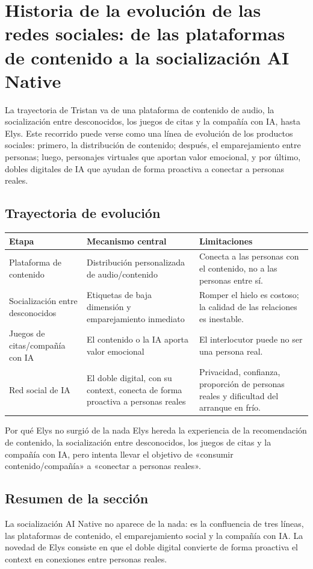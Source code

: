 \section{Historia de la evolución de las redes sociales: de las plataformas de contenido a la socialización AI Native}

La trayectoria de Tristan va de una plataforma de contenido de audio, la socialización entre desconocidos, los juegos de citas y la compañía con IA, hasta Elys. Este recorrido puede verse como una línea de evolución de los productos sociales: primero, la distribución de contenido; después, el emparejamiento entre personas; luego, personajes virtuales que aportan valor emocional, y por último, dobles digitales de IA que ayudan de forma proactiva a conectar a personas reales.

\subsection{Trayectoria de evolución}

\noindent\begin{longtable}{p{}p{}p{}}
\toprule
Etapa & Mecanismo central & Limitaciones \\
\midrule
Plataforma de contenido & Distribución personalizada de audio/contenido & Conecta a las personas con el contenido, no a las personas entre sí. \\
Socialización entre desconocidos & Etiquetas de baja dimensión y emparejamiento inmediato & Romper el hielo es costoso; la calidad de las relaciones es inestable. \\
Juegos de citas/compañía con IA & El contenido o la IA aporta valor emocional & El interlocutor puede no ser una persona real. \\
Red social de IA & El doble digital, con su context, conecta de forma proactiva a personas reales & Privacidad, confianza, proporción de personas reales y dificultad del arranque en frío. \\
\bottomrule
\end{longtable}

\begin{knowledgebox}{Por qué Elys no surgió de la nada}
Elys hereda la experiencia de la recomendación de contenido, la socialización entre desconocidos, los juegos de citas y la compañía con IA, pero intenta llevar el objetivo de «consumir contenido/compañía» a «conectar a personas reales».
\end{knowledgebox}

\subsection{Resumen de la sección}

La socialización AI Native no aparece de la nada: es la confluencia de tres líneas, las plataformas de contenido, el emparejamiento social y la compañía con IA. La novedad de Elys consiste en que el doble digital convierte de forma proactiva el context en conexiones entre personas reales.
